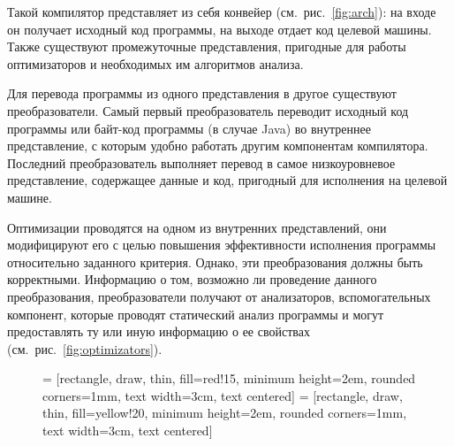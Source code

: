\documentclass[14pt,titlepage]{extarticle}
\newcommand{\eng}[1]{{\English#1}}
\newenvironment{myfigure}[2]%
  {\pushQED{\caption{#1} \label{#2}} %
   \begin{figure}[!htb]\centering } %
  {  \popQED %
   \end{figure}}
\newcommand{\java}{\eng{Java}\xspace}
\begin{document}
      Такой компилятор представляет из себя конвейер (см.~рис.~\ref{fig:arch}):
      на входе он получает исходный код программы, на выходе отдает код целевой
      машины.
      Также существуют промежуточные представления, пригодные для работы
      оптимизаторов и необходимых им алгоритмов анализа.

      Для перевода программы из одного представления в другое существуют
      преобразователи.
      Самый первый преобразователь переводит исходный код программы
      или байт-код программы (в случае \java)
      во внутреннее представление, с которым удобно работать другим
      компонентам компилятора.
      Последний преобразователь выполняет перевод в самое низкоуровневое
      представление, содержащее данные и код, пригодный для исполнения
      на целевой машине.

      Оптимизации проводятся на одном из внутренних представлений, они
      модифицируют его с целью повышения эффективности исполнения программы
      относительно заданного критерия. Однако, эти преобразования должны быть
      корректными. Информацию о том, возможно ли проведение данного
      преобразования, преобразователи получают от анализаторов, вспомогательных
      компонент, которые проводят статический анализ программы и могут
      предоставлять ту или иную информацию о ее свойствах
      (см.~рис.~\ref{fig:optimizators}).

      \begin{myfigure}%
        {Оптимизаторы и анализаторы}%
        {fig:optimizators}

         = [rectangle, draw, thin, fill=red!15,
                            minimum height=2em, rounded corners=1mm,
                            text width=3cm, text centered]
         =  [rectangle, draw, thin, fill=yellow!20,
                            minimum height=2em, rounded corners=1mm,
                            text width=3cm, text centered]

      \end{myfigure}
\end{document}
